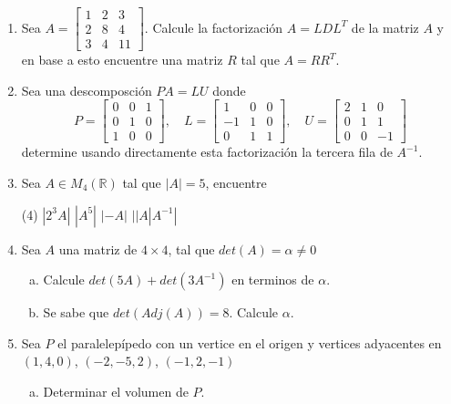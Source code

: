 \documentclass[12pt]{article}
\newenvironment{preguntas}
{\begin{enumerate}\itemsep12pt
	}
	{
	\end{enumerate}
}
\newcommand{\R}{\mathbb{R}}
\begin{document}
\begin{preguntas}
	$$A = \begin{bmatrix}
	2 & 4 & -1 & 5 & -2 \\
	-4 & -5 & 3 & -8 & 1 \\
	2 & -5 & -4 & 1 & 8 \\
	-6 & 0 & 7 & -3 & 1
	\end{bmatrix}$$
\item Sea $A = \begin{bmatrix}
	1 & 2 & 3\\
	2 & 8 & 4 \\
	3 & 4 & 11\end{bmatrix}$. Calcule la factorización $A=LDL^T$ de la matriz $A$ y en base a esto encuentre una matriz $R$ tal que $A = RR^T$.
\item Sea una descomposción $PA = LU$ donde
	$$P = \begin{bmatrix}
	0 & 0 & 1\\
	0 & 1 & 0\\
	1 & 0 & 0
	\end{bmatrix}, \quad
	L = \begin{bmatrix}
	1 & 0 & 0\\
	-1 & 1 & 0\\
	0 & 1 & 1
	\end{bmatrix}, \quad
	U = \begin{bmatrix}
	2 & 1 & 0\\
	0 & 1 & 1\\
	0 & 0 & -1
	\end{bmatrix}$$
	determine usando directamente esta factorización la tercera fila de $A^{-1}$.
\item Sea $A \in M_4 (\R)$ tal que $|A|=5$, encuentre
\begin{tasks}(4)
\task $|2^3A|$
\task $|A^5|$
\task $|-A|$
\task $||A|A^{-1}|$
\end{tasks}
\item Sea $A$ una matriz de $4\times 4$, tal que $det(A) = \alpha \neq 0$
\begin{enumerate}[a)]
\item Calcule  $det(5A)+det(3A^{-1})$ en terminos de $\alpha$.
\item Se sabe que $det(Adj(A))=8$. Calcule $\alpha$.
\end{enumerate}
\item Sea $P$ el paralelepípedo con un vertice en el origen y vertices adyacentes en $(1,4,0)$, $(-2,-5,2)$, $(-1,2,-1)$
\begin{enumerate}[a)]
\item Determinar el volumen de $P$.

\end{enumerate}
\end{preguntas}
\end{document}
